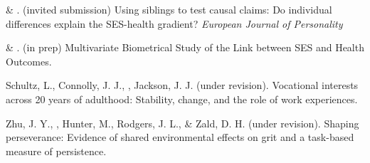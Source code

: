 \item \meb \& \joe. (invited submission) Using siblings to test causal claims: Do individual differences explain the SES-health gradient? \textit{European Journal of Personality}
\item \meb \& \joe. (in prep) Multivariate Biometrical Study of the Link between SES and Health Outcomes.
\item Schultz, L., Connolly, J. J., \meb, Jackson, J. J. (under revision). Vocational interests across 20 years of adulthood: Stability, change, and the role of work experiences.
\item Zhu, J. Y., \meb, Hunter, M., Rodgers, J. L., \& Zald, D. H. (under revision). Shaping perseverance: Evidence of shared environmental effects on grit and a task-based measure of persistence.
\vspace{-2mm}\begin{center}\end{center} \vspace{-4mm}